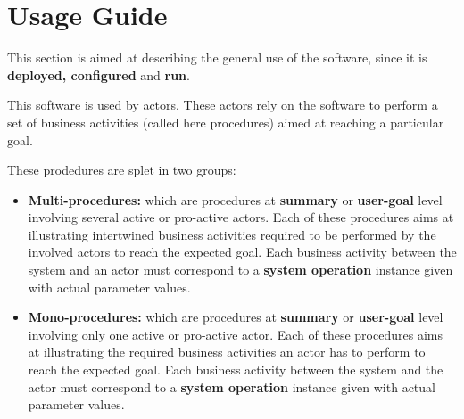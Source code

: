 \chapter{Usage Guide}
\label{chap:usage_guide}

This section is aimed at describing the general use of the software, since it is
\textbf{deployed, configured} and \textbf{run}.

This software is used by actors. These actors rely on the software to perform a
set of business activities (called here procedures) aimed at reaching a
particular goal. 

These prodedures are splet in two groups:
\begin{itemize}
  \item \textbf{Multi-procedures:} which are procedures at \textbf{summary} or
  \textbf{user-goal} level involving several active or pro-active actors.
  Each of these procedures aims at illustrating intertwined
  business activities required to be performed by the involved actors
  to reach the expected goal. Each business activity between the system and an
  actor must correspond to a \textbf{system operation} instance given with actual parameter values.

  \item \textbf{Mono-procedures:} which are procedures at \textbf{summary} or
  \textbf{user-goal} level involving only one active or pro-active actor.
  Each of these procedures aims at illustrating the required business
  activities an actor has to perform to reach the expected goal. Each business
  activity between the system and the actor must correspond to a \textbf{system
  operation} instance given with actual parameter values.

\end{itemize}




